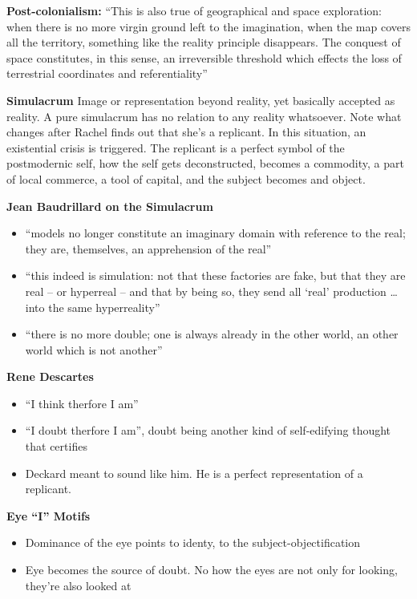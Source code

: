 \documentclass[11pt,fleqn]{book}
\begin{document}
\textbf{Post-colonialism: }\enquote{This is also true of
geographical and space
exploration: when there is no
more virgin ground left to the
imagination, when the map
covers all the territory,
something like the reality
principle disappears. The
conquest of space constitutes,
in this sense, an irreversible
threshold which effects the loss
of terrestrial coordinates and
referentiality}

\textbf{Simulacrum} Image or representation beyond reality, yet basically accepted as reality. A pure simulacrum has no relation to any reality whatsoever. Note what changes after Rachel finds out that she's a replicant. In this situation, an existential crisis is triggered. The replicant is a perfect symbol of the postmodernic self, how the self gets deconstructed, becomes a commodity, a part of local commerce, a tool of capital, and the subject becomes and object. 

\textbf{Jean Baudrillard on the Simulacrum}
\begin{itemize}
    \item \enquote{models no longer constitute an imaginary
domain with reference to the real; they
are, themselves, an apprehension of the
real}
    \item \enquote{this indeed is simulation: not that these
factories are fake, but that they are real –
or hyperreal – and that by being so, they
send all ‘real’ production … into the same
hyperreality}
    \item \enquote{there is no more double; one is always
already in the other world, an other
world which is not another}
\end{itemize}

\textbf{Rene Descartes}
\begin{itemize}
    \item \enquote{I think therfore I am}
    \item \enquote{I doubt therfore I am}, doubt being another kind of self-edifying thought that certifies
    \item Deckard meant to sound like him. He is a perfect representation of a replicant. 
\end{itemize}

\textbf{Eye \enquote{I} Motifs}
\begin{itemize}
    \item Dominance of the eye points to identy, to the subject-objectification
    \item Eye becomes the source of doubt. No how the eyes are not only for looking, they're also looked at
\end{itemize}
\end{document}
